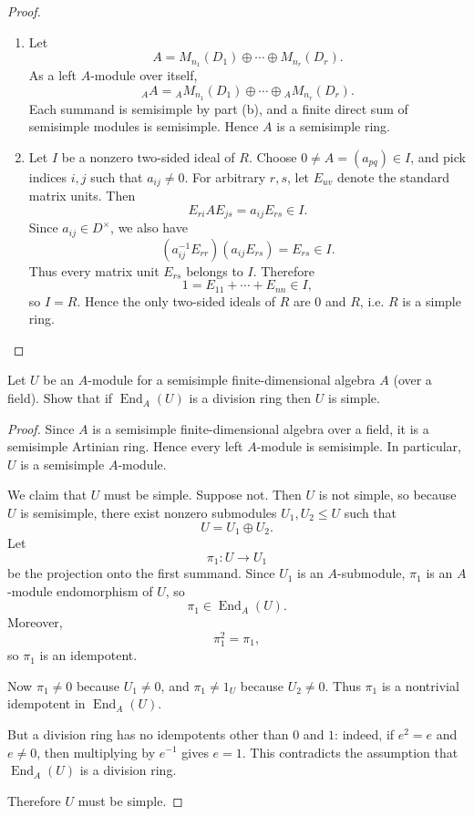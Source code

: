 \begin{proof}
\begin{enumerate}
        \item Let
              \[
                  A=M_{n_1}(D_1)\oplus\cdots\oplus M_{n_r}(D_r).
              \]
              As a left $A$-module over itself,
              \[
                  {}_AA
                  =
                  {}_A M_{n_1}(D_1)\oplus\cdots\oplus {}_A M_{n_r}(D_r).
              \]
              Each summand is semisimple by part (b), and a finite direct sum of semisimple modules is semisimple. Hence $A$ is a semisimple ring.

        \item Let $I$ be a nonzero two-sided ideal of $R$. Choose $0\neq A=(a_{pq})\in I$, and pick indices $i,j$ such that $a_{ij}\neq 0$. For arbitrary $r,s$, let $E_{uv}$ denote the standard matrix units. Then
              \[
                  E_{ri}AE_{js}=a_{ij}E_{rs}\in I.
              \]
              Since $a_{ij}\in D^\times$, we also have
              \[
                  (a_{ij}^{-1}E_{rr})(a_{ij}E_{rs})=E_{rs}\in I.
              \]
              Thus every matrix unit $E_{rs}$ belongs to $I$. Therefore
              \[
                  1=E_{11}+\cdots+E_{nn}\in I,
              \]
              so $I=R$. Hence the only two-sided ideals of $R$ are $0$ and $R$, i.e. $R$ is a simple ring.
    \end{enumerate}
\end{proof}

\begin{exercise}
    Let $U$ be an $A$-module for a semisimple finite-dimensional algebra $A$ (over a field). Show that if $\operatorname{End}_A(U)$ is a division ring then $U$ is simple.
\end{exercise}

\begin{proof}
    Since $A$ is a semisimple finite-dimensional algebra over a field, it is a semisimple
    Artinian ring. Hence every left $A$-module is semisimple. In particular, $U$ is a semisimple
    $A$-module.

    We claim that $U$ must be simple. Suppose not. Then $U$ is not simple, so because $U$
    is semisimple, there exist nonzero submodules $U_1,U_2\leq U$ such that
    \[
        U=U_1\oplus U_2.
    \]
    Let
    \[
        \pi_1:U\to U_1
    \]
    be the projection onto the first summand. Since $U_1$ is an $A$-submodule, $\pi_1$ is an
    $A$-module endomorphism of $U$, so
    \[
        \pi_1\in \operatorname{End}_A(U).
    \]
    Moreover,
    \[
        \pi_1^2=\pi_1,
    \]
    so $\pi_1$ is an idempotent.

    Now $\pi_1\neq 0$ because $U_1\neq 0$, and $\pi_1\neq 1_U$ because $U_2\neq 0$.
    Thus $\pi_1$ is a nontrivial idempotent in $\operatorname{End}_A(U)$.

    But a division ring has no idempotents other than $0$ and $1$: indeed, if $e^2=e$ and
    $e\neq 0$, then multiplying by $e^{-1}$ gives $e=1$. This contradicts the assumption that
    $\operatorname{End}_A(U)$ is a division ring.

    Therefore $U$ must be simple.
\end{proof}

